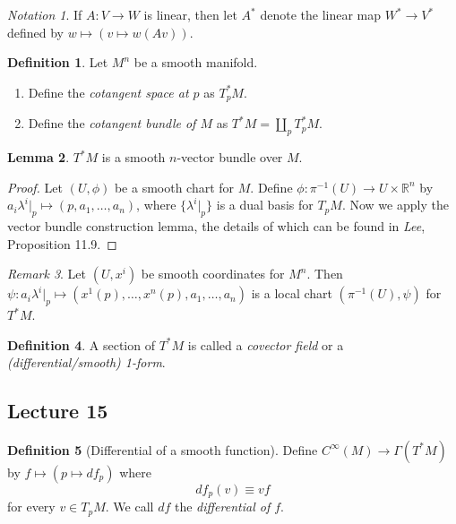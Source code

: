 \documentclass[10pt,letterpaper,cm]{nupset}
\theoremstyle{definition}
\newtheorem{definition}{Definition}[subsection]
\theoremstyle{theorem}
\newtheorem{lemma}[definition]{Lemma}
\theoremstyle{remark}
\newtheorem{remark}[definition]{Remark}
\newtheorem*{notation}{Notation}
\newcommand{\R}{\mathbb R}
\newcommand{\1}{\mathbf{1}}
\newcommand{\0}{\vec 0}
\begin{document}
\begin{notation}
If $A : V \to W$ is linear, then let $A^{\ast}$ denote the linear map  $W^{\ast} \to V^{\ast}$ defined by $w \mapsto (v \mapsto w(Av))$.
\end{notation}

\begin{definition} 
Let $M^n$ be a smooth manifold.
\begin{enumerate}
\item Define the \textit{cotangent space at $p$} as $T_p^{\ast}M$. 
\item Define the \textit{cotangent bundle of $M$} as $T^{\ast}M = \coprod_p T_p^{\ast}M$.
\end{enumerate}
\end{definition}

\begin{lemma}
$T^{\ast}M$ is a smooth $n$-vector bundle over $M$.
\end{lemma}
\begin{proof}
Let $(U, \phi)$ be a smooth chart for $M$. Define $\phi : \pi^{-1}(U) \to U \times \R^n$ by $a_i \lambda^i\bigr\rvert_p \mapsto (p, a_1, \ldots, a_n)$, where $\{\lambda^i \bigr\rvert_p\}$ is a dual basis for $T_pM$. Now we apply the vector bundle construction lemma, the details of which can be found in \textit{Lee}, Proposition 11.9.
\end{proof}

\begin{remark}
Let $(U, x^i)$ be smooth coordinates for $M^n$. Then $\psi: a_i\lambda^i\bigr\rvert_p \mapsto (x^1(p), \ldots, x^n(p), a_1, \ldots, a_n)$ is a local chart $(\pi^{-1}(U), \psi)$ for $T^{\ast}M$.
\end{remark}

\begin{definition}
A section of $T^{\ast}M$ is called a \textit{covector field} or a \textit{(differential/smooth) 1-form}.
\end{definition}

\subsection{Lecture 15}

\begin{definition}[Differential of a smooth function]\label{diff}
Define $C^{\infty}(M) \to \Gamma(T^{\ast}M)$ by $f \mapsto (p\mapsto df_p)$ where $$df_p(v) \equiv vf$$ for every $v\in T_pM$. We call $df$ the \textit{differential of $f$}.
\end{definition}
\end{document}
